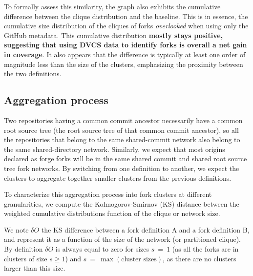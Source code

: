 To formally assess this similarity, the graph also exhibits the cumulative
difference between the clique distribution and the baseline. This is in
essence, the cumulative size distribution of the cliques of forks
\emph{overlooked} when using only the GitHub metadata. 
This cumulative
distribution \textbf{mostly stays positive, suggesting that using DVCS data to
identify forks is overall a net gain in coverage}.
It also appears that the
difference is typically at least one order of magnitude less than the size of
the clusters, emphasizing the proximity between the two definitions.

\subsection{Aggregation process}%
\label{sec:forks-aggregation-process}

Two repositories having a common commit ancestor necessarily have a common root
source tree (the root source tree of that common commit ancestor), so all the
repositories that belong to the same shared-commit network also belong to
the same shared-directory network.
Similarly, we expect that most origins declared as forge forks will be
in the same shared commit and shared root source tree fork networks.
By switching from one definition to another, we expect the clusters to
aggregate together smaller clusters from the previous definitions.

To characterize this aggregation process into fork clusters at different
granularities, we compute the Kolmogorov-Smirnov (KS) distance between the
weighted cumulative distributions function of the clique or network size.

We note $\delta O$ the KS difference between a fork
definition A and a fork definition B, and
represent it as a function of the size of the network (or partitioned clique).
By definition $\delta O$ is always equal to zero for sizes $s~=~1$ (as all the
forks are in clusters of size $s \geq 1$) and $s~=~\max(\text{cluster
sizes})$, as there are no clusters larger than this size.

